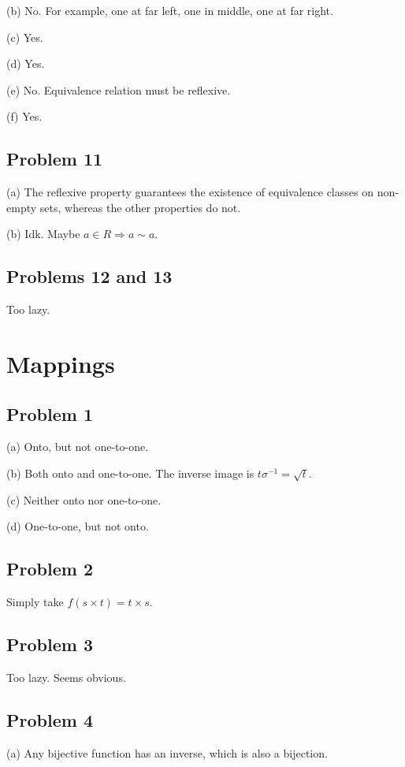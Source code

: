 \documentclass{book}
\begin{document}
\noindent
(b)
No. For example, one at far left, one in middle, one at far right.

\noindent
(c)
Yes.

\noindent
(d)
Yes.

\noindent
(e)
No. Equivalence relation must be reflexive.

\noindent
(f)
Yes.

\subsection*{Problem 11}
(a)
The reflexive property guarantees the existence of equivalence classes on non-empty sets, whereas the other properties do not.

\noindent
(b)
Idk. Maybe $a \in R \Rightarrow a \sim a$.

\subsection*{Problems 12 and 13}
Too lazy.

\section{Mappings}

\subsection*{Problem 1}
(a)
Onto, but not one-to-one.

\noindent
(b)
Both onto and one-to-one. The inverse image is $t \sigma^{-1} = \sqrt{t}$.

\noindent
(c)
Neither onto nor one-to-one.

\noindent
(d)
One-to-one, but not onto.

\subsection*{Problem 2}
Simply take $f(s \times t) = t \times s$.

\subsection*{Problem 3}
Too lazy. Seems obvious.

\subsection*{Problem 4}
(a)
Any bijective function has an inverse, which is also a bijection.
\end{document}
